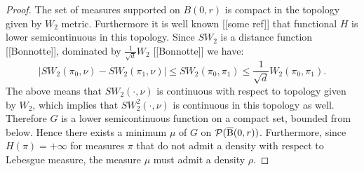 \begin{proof}
The set of measures supported on $B(0,r)$ is compact in the topology given by $W_2$ metric. Furthermore it is well known [[some ref]] that functional $H$ is lower semicontinuous in this topology. Since $SW_2$ is a distance function [[Bonnotte]], dominated by $\frac{1}{\sqrt{d}} W_2$ [[Bonnotte]] we have:
\[
|SW_2(\pi_0, \nu) - SW_2(\pi_1, \nu)| \leq SW_2(\pi_0, \pi_1) \leq \frac{1}{\sqrt{d}}W_2(\pi_0, \pi_1).
\]
The above means that $SW_2(\cdot, \nu)$ is continuous with respect to topology given by $W_2$, which implies that $SW_2^2(\cdot, \nu)$ is continuous in this topology as well. Therefore $G$ is a lower semicontinuous function on a compact set, bounded from below. Hence there exists a minimum  $\mu$ of $G$ on $\mathcal{P}(\operatorname{\overline{B}}(0,r))$. Furthermore, since $H(\pi) = +\infty$  for measures $\pi$ that do not admit a density with respect to Lebesgue measure, the measure $\mu$ must admit a density $\rho$.


\end{proof}
